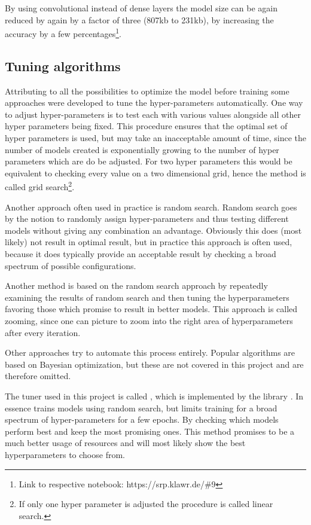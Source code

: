 By using convolutional instead of dense layers the model size can be again reduced by again by a factor of three (807kb to 231kb), by increasing the accuracy by a few percentages\footnote{Link to respective notebook: https://srp.klawr.de/\#9}.

\subsection{Tuning algorithms}

Attributing to all the possibilities to optimize the model before training some approaches were developed to tune the hyper-parameters automatically.
One way to adjust hyper-parameters is to test each with various values alongside all other hyper parameters being fixed.
This procedure ensures that the optimal set of hyper parameters is used, but may take an inacceptable amount of time, since the number of models created is exponentially growing to the number of hyper parameters which are do be adjusted.
For two hyper parameters this would be equivalent to checking every value on a two dimensional grid, hence the method is called grid search\footnote{If only one hyper parameter is adjusted the procedure is called linear search.}.

Another approach often used in practice is random search.
Random search goes by the notion to randomly assign hyper-parameters and thus testing different models without giving any combination an advantage.
Obviously this does (most likely) not result in optimal result, but in practice this approach is often used, because it does typically provide an acceptable result by checking a broad spectrum of possible configurations.

Another method is based on the random search approach by repeatedly examining the results of random search and then tuning the hyperparameters favoring those which promise to result in better models.
This approach is called zooming, since one can picture to zoom into the right area of hyperparameters after every iteration.

Other approaches try to automate this process entirely.
Popular algorithms are based on Bayesian optimization, but these are not covered in this project and are therefore omitted.

The tuner used in this project is called  \cite{Li2018}, which is implemented by the library  \cite{Google2019a}.
In essence  trains models using random search, but limits training for a broad spectrum of hyper-parameters for a few epochs.
By checking which models perform best and keep the most promising ones.
This method promises to be a much better usage of resources and will most likely show the best hyperparameters to choose from.

